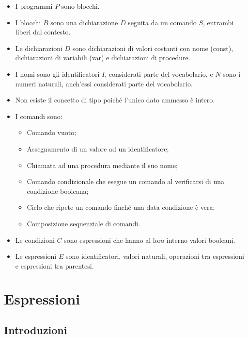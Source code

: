 \documentclass[a4paper]{article}
\begin{document}
	\begin{itemize}
		\item I programmi $P$ sono blocchi.
		
		\item I blocchi $B$ sono una dichiarazione $D$ seguita da un comando $S$, entrambi liberi dal contesto.
		
		\item Le dichiarazioni $D$ sono dichiarazioni di valori costanti con nome (const), dichiarazioni di variabili (var) e dichiarazioni di procedure.
		
		\item I nomi sono gli identificatori $I$, considerati parte del vocabolario, e $N$ sono i numeri naturali, anch'essi considerati parte del vocabolario.
		
		\item Non esiste il concetto di tipo poiché l'unico dato ammesso è intero.
		
		\item I comandi sono:
		\begin{itemize}
			\item Comando vuoto;
			\item Assegnamento di un valore ad un identificatore;
			\item Chiamata ad una procedura mediante il suo nome;
			\item Comando condizionale che esegue un comando al verificarsi di una condizione booleana;
			\item Ciclo che ripete un comando finché una data condizione è vera;
			\item Composizione sequenziale di comandi.
		\end{itemize}
	
		\item Le condizioni $C$ sono espressioni che hanno al loro interno valori booleani.
		
		\item Le espressioni $E$ sono identificatori, valori naturali, operazioni tra espressioni e espressioni tra parentesi.
	\end{itemize}\newpage

	\section{Espressioni}
	
	\subsection{Introduzioni}
	
\end{document}

